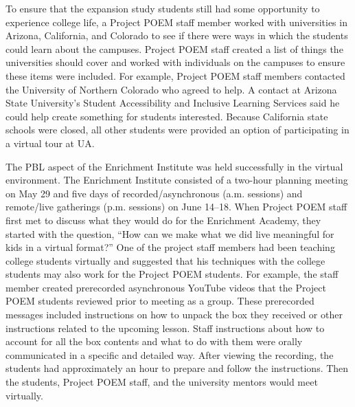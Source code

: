 \documentclass[11pt]{sig-alternate}
\begin{document}
\begin{large}
{To ensure that the expansion study students still had some opportunity to experience college life, a Project POEM staff member worked with universities in Arizona, California, and Colorado to see if there were ways in which the students could learn about the campuses. Project POEM staff created a list of things the universities should cover and worked with individuals on the campuses to ensure these items were included. For example, Project POEM staff members contacted the University of Northern Colorado who agreed to help. A contact at Arizona State University’s Student Accessibility and Inclusive Learning Services said he could help create something for students interested. Because California state schools were closed, all other students were provided an option of participating in a virtual tour at UA. 

The PBL aspect of the Enrichment Institute was held successfully in the virtual environment. The Enrichment Institute consisted of a two-hour planning meeting on May 29 and five days of recorded/asynchronous (a.m. sessions) and remote/live gatherings (p.m. sessions) on June 14–18. When Project POEM staff first met to discuss what they would do for the Enrichment Academy, they started with the question, “How can we make what we did live meaningful for kids in a virtual format?” One of the project staff members had been teaching college students virtually and suggested that his techniques with the college students may also work for the Project POEM students. For example, the staff member created prerecorded asynchronous YouTube videos that the Project POEM students reviewed prior to meeting as a group. These prerecorded messages included instructions on how to unpack the box they received or other instructions related to the upcoming lesson. Staff instructions about how to account for all the box contents and what to do with them were orally communicated in a specific and detailed way. After viewing the recording, the students had approximately an hour to prepare and follow the instructions. Then the students, Project POEM staff, and the university mentors would meet virtually.

}
\end{large}
\end{document}
